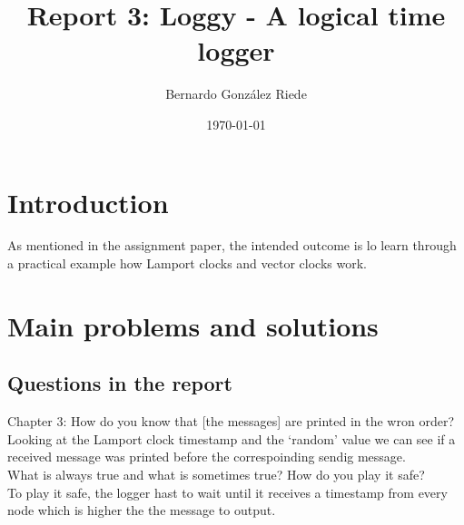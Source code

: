 \documentclass[a4paper, 11pt]{article}
\title{Report 3: Loggy - A logical time logger}
\author{Bernardo González Riede}
\date{\today{}}
\begin{document}
\maketitle

\section{Introduction}


As mentioned in the assignment paper, the intended outcome is lo learn through a practical example how Lamport clocks and vector clocks work.

\section{Main problems and solutions}
\subsection{Questions in the report}
Chapter 3: How do you know that [the messages] are printed in the wron order?
\\Looking at the Lamport clock timestamp and the `random' value we can see if a received message was printed before the correspoinding sendig message.
\\What is always true and what is sometimes true? How do you play it safe?
\\To play it safe, the logger hast to wait until it receives a timestamp from every node which is higher the the message to output.
\end{document}

